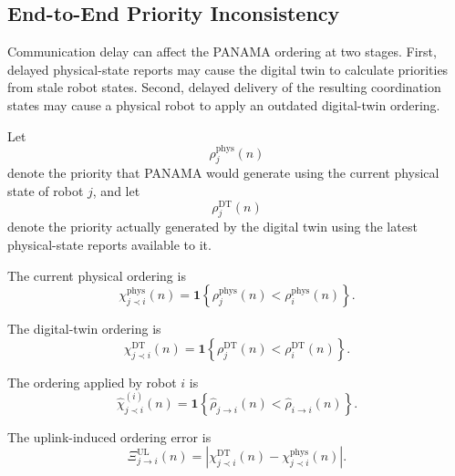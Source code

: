 \IfFileExists{IEEEtran.cls}{\documentclass[conference]{IEEEtran}}{\documentclass[10pt,twocolumn]{article}}
\begin{document}
\subsection{End-to-End Priority Inconsistency}
\label{subsec:end_to_end_priority_inconsistency}

Communication delay can affect the PANAMA ordering at two stages. First, delayed physical-state reports may cause the digital twin to calculate priorities from stale robot states. Second, delayed delivery of the resulting coordination states may cause a physical robot to apply an outdated digital-twin ordering.

Let
\begin{equation}
    \rho_j^{\mathrm{phys}}(n)
\end{equation}
denote the priority that PANAMA would generate using the current physical state of robot \(j\), and let
\begin{equation}
    \rho_j^{\mathrm{DT}}(n)
\end{equation}
denote the priority actually generated by the digital twin using the latest physical-state reports available to it.

The current physical ordering is
\begin{equation}
    \chi_{j\prec i}^{\mathrm{phys}}(n)
    =
    \mathbf{1}
    \left\{
        \rho_j^{\mathrm{phys}}(n)
        <
        \rho_i^{\mathrm{phys}}(n)
    \right\}.
    \label{eq:physical_priority_relation}
\end{equation}

The digital-twin ordering is
\begin{equation}
    \chi_{j\prec i}^{\mathrm{DT}}(n)
    =
    \mathbf{1}
    \left\{
        \rho_j^{\mathrm{DT}}(n)
        <
        \rho_i^{\mathrm{DT}}(n)
    \right\}.
    \label{eq:dt_priority_relation}
\end{equation}

The ordering applied by robot \(i\) is
\begin{equation}
    \widehat{\chi}_{j\prec i}^{(i)}(n)
    =
    \mathbf{1}
    \left\{
        \widehat{\rho}_{j\rightarrow i}(n)
        <
        \widehat{\rho}_{i\rightarrow i}(n)
    \right\}.
    \label{eq:perceived_priority_relation}
\end{equation}

The uplink-induced ordering error is
\begin{equation}
    \Xi_{j\rightarrow i}^{\mathrm{UL}}(n)
    =
    \left|
        \chi_{j\prec i}^{\mathrm{DT}}(n)
        -
        \chi_{j\prec i}^{\mathrm{phys}}(n)
    \right|.
    \label{eq:uplink_ordering_error}
\end{equation}
\end{document}
